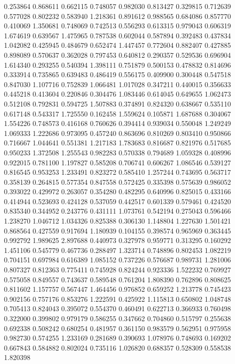 0.253864
0.868611
0.662115
0.748057
0.982030
0.813427
0.329815
0.712639
0.577028
0.802232
0.583940
1.218361
0.891612
0.988565
0.684086
0.857770
0.410069
1.350681
0.748069
0.742513
0.556293
0.613315
0.979043
0.606319
1.674619
0.639567
1.475965
0.787538
0.602044
0.587894
0.392483
0.437834
1.042082
0.425945
0.484679
0.652474
1.447457
0.772604
0.882407
0.427885
0.898089
0.570637
0.362028
0.797453
0.640812
0.290357
0.529536
0.696904
1.614340
0.293255
0.540394
1.398111
0.751879
0.500153
0.478832
0.814696
0.333914
0.735865
0.639483
0.486419
0.556175
0.409900
0.300448
0.547518
0.847030
1.107716
0.752839
1.066481
1.017028
0.347211
0.440015
0.356633
0.445218
0.413604
0.220846
0.304476
1.083446
0.614045
0.649655
1.062473
0.512108
0.792831
0.594725
1.507883
0.374891
0.824320
0.638667
0.535110
0.617148
0.543317
1.725550
0.162458
1.559624
0.105871
1.687688
0.304067
1.554226
0.748573
0.416168
0.760626
0.394414
0.939034
0.550048
1.249249
1.069333
1.222686
0.973095
0.457240
0.863696
0.810269
0.803410
0.950866
0.716667
1.044641
0.551381
1.217183
1.783683
0.816687
0.821976
0.517685
0.950233
1.372508
1.255543
0.982283
0.570338
0.794689
1.059328
0.408996
0.922015
0.781100
1.197827
0.585208
0.706741
0.606267
1.086546
0.539127
0.816545
0.953253
1.233491
0.823272
0.585410
1.257244
0.743695
0.563717
0.358139
0.264815
0.577354
0.847558
0.572425
0.335398
0.575639
0.986052
0.393022
0.429972
0.263057
0.354280
0.482295
0.640996
0.825015
0.433166
0.414944
0.523693
0.424128
0.537059
0.442517
0.601339
0.579461
0.424520
0.835340
0.344952
0.243776
0.431111
1.073761
0.542194
0.275043
0.596466
1.238270
1.046712
1.034326
0.825388
0.306130
1.148804
1.227630
1.501421
0.868564
0.427559
0.917694
1.180939
0.104155
0.398574
0.965969
0.363445
0.992792
1.989625
2.897688
0.440973
0.327978
0.959771
0.313295
0.160292
1.451106
0.545779
0.467736
0.288497
1.323714
0.748896
0.802453
1.082219
0.704151
0.697984
0.616389
1.085152
0.737226
0.576687
0.989731
1.281006
0.807327
0.812363
0.775411
0.745928
0.824244
0.923336
1.522232
0.769927
0.575058
0.849557
0.743637
0.589548
0.761204
1.808390
0.762896
0.808625
0.811602
1.157757
0.567447
1.464456
0.976852
0.659252
1.213778
0.745423
0.902156
0.757176
0.853276
1.222591
0.425922
1.115813
0.650802
1.048748
0.705413
0.824043
0.395072
0.554370
0.460491
0.622713
0.366933
0.760498
0.322000
0.399802
0.979179
0.586255
0.347662
0.704860
0.515797
0.255638
0.692338
0.508242
0.680254
0.481957
0.361150
0.983579
0.562951
0.975958
0.982730
0.574255
1.233169
0.281689
0.390693
1.078976
0.748693
0.169202
0.667843
0.584882
0.802024
0.735116
1.026820
0.688357
0.528309
0.558538
1.820398

